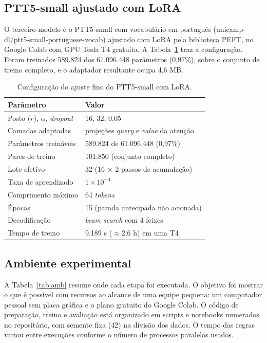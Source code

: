 \documentclass[12pt]{article}
\newcommand{\gl}[1]{\textsf{\small #1}}
\begin{document}
\subsection{PTT5-small ajustado com LoRA}

O terceiro modelo é o PTT5-small com vocabulário em português (\gl{unicamp-dl/ptt5-small-portuguese-vocab}) ajustado com LoRA pela biblioteca PEFT, no Google Colab com GPU Tesla T4 gratuita. A Tabela~\ref{tab:lora} traz a configuração. Foram treinados 589.824 dos 61.096.448 parâmetros (0,97\%), sobre o conjunto de treino completo, e o adaptador resultante ocupa 4,6 MB.

\begin{table}[!htbp]\centering\footnotesize
\caption{Configuração do ajuste fino do PTT5-small com LoRA.}\label{tab:lora}
\begin{tabular}{@{}ll@{}}\toprule
Parâmetro & Valor\\\midrule
Posto ($r$), $\alpha$, \emph{dropout} & 16, 32, 0,05\\
Camadas adaptadas & projeções \emph{query} e \emph{value} da atenção\\
Parâmetros treináveis & 589.824 de 61.096.448 (0,97\%)\\
Pares de treino & 101.850 (conjunto completo)\\
Lote efetivo & 32 (16 $\times$ 2 passos de acumulação)\\
Taxa de aprendizado & $1\times10^{-4}$\\
Comprimento máximo & 64 \emph{tokens}\\
Épocas & 15 (parada antecipada não acionada)\\
Decodificação & \emph{beam search} com 4 feixes\\
Tempo de treino & 9.189 s ($\approx$2,6 h) em uma T4\\\bottomrule
\end{tabular}
\end{table}

\subsection{Ambiente experimental}

A Tabela~\ref{tab:amb} resume onde cada etapa foi executada. O objetivo foi mostrar o que é possível com recursos ao alcance de uma equipe pequena: um computador pessoal sem placa gráfica e o plano gratuito do Google Colab. O código de preparação, treino e avaliação está organizado em scripts e notebooks numerados no repositório, com semente fixa (42) na divisão dos dados. O tempo das regras variou entre execuções conforme o número de processos paralelos usados.
\end{document}
